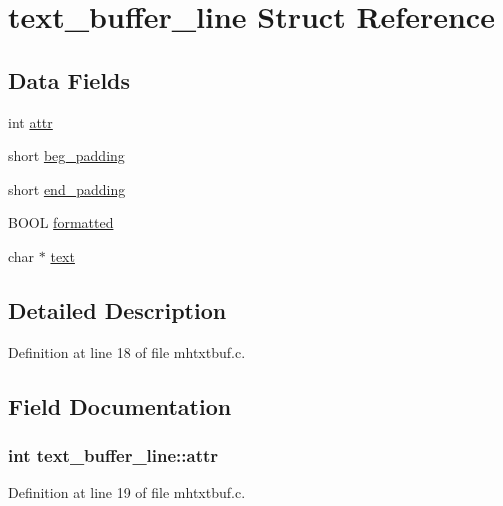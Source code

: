 \hypertarget{structtext__buffer__line}{\section{text\+\_\+buffer\+\_\+line Struct Reference}
\label{structtext__buffer__line}
}
\subsection*{Data Fields}
\begin{DoxyCompactItemize}
\item 
int \hyperlink{structtext__buffer__line_a2f755726b09338da45acd955ab8775e2}{attr}
\item 
short \hyperlink{structtext__buffer__line_a14587c527cf165fc1f83fee0f32fbc3b}{beg\+\_\+padding}
\item 
short \hyperlink{structtext__buffer__line_aacec6fcbbd5dbcbd1b4bee8d9947b6ee}{end\+\_\+padding}
\item 
B\+O\+O\+L \hyperlink{structtext__buffer__line_a954908a09498bbd0349c82db8836b36e}{formatted}
\item 
char $\ast$ \hyperlink{structtext__buffer__line_ab3af8e4e600d655d06c514cd743eca92}{text}
\end{DoxyCompactItemize}


\subsection{Detailed Description}


Definition at line 18 of file mhtxtbuf.\+c.



\subsection{Field Documentation}
\hypertarget{structtext__buffer__line_a2f755726b09338da45acd955ab8775e2}{
\subsubsection[{attr}]{\setlength{\rightskip}{0pt plus 5cm}int text\+\_\+buffer\+\_\+line\+::attr}}\label{structtext__buffer__line_a2f755726b09338da45acd955ab8775e2}


Definition at line 19 of file mhtxtbuf.\+c.



